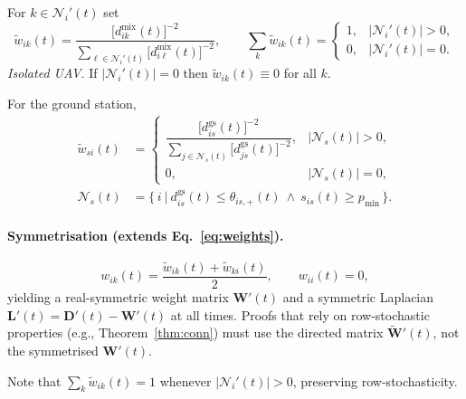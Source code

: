 \documentclass[preprint,12pt]{elsarticle}
\theoremstyle{definition}\newtheorem{definition}{Definition}
\theoremstyle{plain}\newtheorem{theorem}{Theorem}
\theoremstyle{plain}\newtheorem{lemma}{Lemma}
\theoremstyle{plain}\newtheorem{corollary}{Corollary}
\theoremstyle{plain}\newtheorem{assumption}{Assumption}
\theoremstyle{remark}\newtheorem{remark}[theorem]{Remark}
\begin{document}
For \(k\in\mathcal N_i'(t)\) set
\[
  \tilde w_{ik}(t)=
  \frac{ \bigl[d^{\text{mix}}_{ik}(t)\bigr]^{-2}}
       {\displaystyle
        \sum_{\ell\in\mathcal N_i'(t)}
        \bigl[d^{\text{mix}}_{i\ell}(t)\bigr]^{-2}},
  \qquad
  \sum_{k}\tilde w_{ik}(t)=
  \begin{cases}
    1, & |\mathcal N_i'(t)|>0,\\
    0, & |\mathcal N_i'(t)|=0.
  \end{cases}
\]
\emph{Isolated UAV.} If \(|\mathcal N_i'(t)|=0\) then
\(\tilde w_{ik}(t)\equiv 0\) for all \(k\).

For the ground station,
\[
\begin{aligned}
  \tilde w_{si}(t)&=
  \begin{cases}
    \dfrac{{\bigl[d^{\text{gs}}_{is}(t)\bigr]^{-2}}}
           {\displaystyle\sum_{j\in\mathcal N_s(t)}
           {\bigl[d^{\text{gs}}_{js}(t)\bigr]^{-2}}}, &
      |\mathcal N_s(t)|>0,\\[6pt]
    0, & |\mathcal N_s(t)|=0,
  \end{cases}\\[4pt]
  \mathcal N_s(t)&=
  \bigl\{\,i\ \big|\ d^{\text{gs}}_{is}(t)\le\theta_{is,+}(t)\ \land\ s_{is}(t)\ge p_{\min}\,\bigr\}.
\end{aligned}
\]

\paragraph{Symmetrisation (extends Eq.~\ref{eq:weights}).}
\[
  w_{ik}(t)=\frac{\tilde w_{ik}(t)+\tilde w_{ki}(t)}{2},
  \qquad
  w_{ii}(t)=0,
\]
yielding a real-symmetric weight matrix \(\boldsymbol W'(t)\) and a symmetric Laplacian \(\boldsymbol L'(t)=\boldsymbol D'(t)-\boldsymbol W'(t)\)
at all times.  Proofs that rely on row-stochastic properties (e.g., Theorem~\ref{thm:conn}) must use the directed matrix \(\tilde{\boldsymbol W}'(t)\), not the symmetrised \(\boldsymbol W'(t)\).

Note that $\sum_{k}\tilde w_{ik}(t)=1$ whenever $|\mathcal N_i'(t)|>0$, preserving row-stochasticity.
\end{document}
